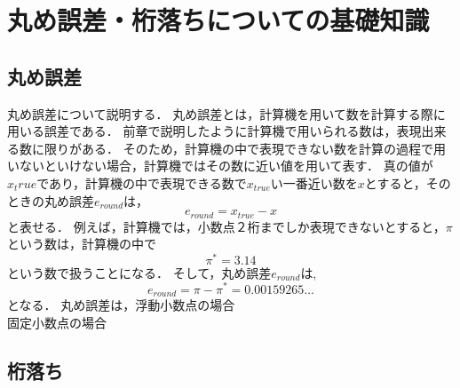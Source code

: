 \chapter{丸め誤差・桁落ちについての基礎知識}
\label{chap:基礎知識2}
\section{丸め誤差}
丸め誤差について説明する．
丸め誤差とは，計算機を用いて数を計算する際に用いる誤差である．
前章で説明したように計算機で用いられる数は，表現出来る数に限りがある．
そのため，計算機の中で表現できない数を計算の過程で用いないといけない場合，計算機ではその数に近い値を用いて表す．
真の値が$x_true$であり，計算機の中で表現できる数で$x_{true}$い一番近い数を$x$とすると，そのときの丸め誤差$e_{round}$は，
\begin{equation}
    e_{round} = x_{true} - x
\end{equation}
と表せる．
例えば，計算機では，小数点２桁までしか表現できないとすると，$\pi$という数は，計算機の中で
\begin{equation}
    \pi^{\ast} = 3.14
\end{equation}
という数で扱うことになる．
そして，丸め誤差$e_{round}$は,
\begin{equation}
    e_{round} = \pi - \pi^{\ast} = 0.00159265\dots
\end{equation}
となる．
丸め誤差は，浮動小数点の場合 \\
固定小数点の場合

\section{桁落ち}